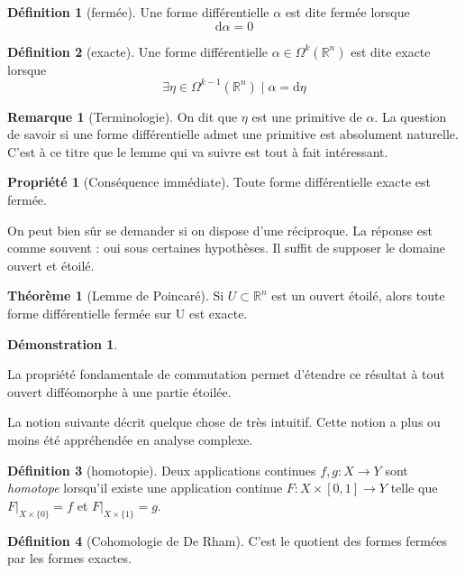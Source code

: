 \documentclass{article}
\newcommand{\R}{\mathbb{R}} %
\theoremstyle{definition} %
\newtheorem{defi}{Définition}
\newtheorem{rmq}{Remarque}
\newtheorem{thm}{Théorème}
\newtheorem{dem}{Démonstration}
\newtheorem{propri}{Propriété}
\newcommand{\OM}[1]{\Omega^{#1} (\R^n)}
\newcommand{\dd}{ \mathrm{d}}
\newcommand{\1}{\mathbb{1}} %
\begin{document}
\begin{defi}[fermée]
Une forme différentielle $\alpha$ est dite fermée lorsque 
$$\dd \alpha = 0$$
\end{defi}

\begin{defi}[exacte]
Une forme différentielle $\alpha \in \OM{k}$ est dite exacte lorsque 
$$\exists \eta \in \OM{k-1} \mid \alpha = \dd \eta$$
\end{defi}
\begin{rmq}[Terminologie]
On dit que $\eta $ est une primitive de $\alpha$. La question de savoir si une forme différentielle admet une primitive est absolument naturelle. C'est à ce titre que le lemme qui va suivre est tout à fait intéressant.
\end{rmq}

\begin{propri}[Conséquence immédiate]
Toute forme différentielle exacte est fermée.
\end{propri}

On peut bien sûr se demander si on dispose d'une réciproque. La réponse est comme souvent : oui sous certaines hypothèses. Il suffit de supposer le domaine ouvert et étoilé.

\begin{thm}[Lemme de Poincaré]
Si $U \subset \R^n$ est un ouvert étoilé, alors toute forme différentielle fermée sur U est exacte.
\end{thm}

\begin{dem}

\end{dem}

La propriété fondamentale de commutation permet d'étendre ce résultat à tout ouvert difféomorphe à une partie étoilée.




La notion suivante décrit quelque chose de très intuitif. Cette notion a plus ou moins été appréhendée en analyse complexe.
\begin{defi}[homotopie]
Deux applications continues $f,g: X\to Y$ sont \textit{homotope} lorsqu'il existe une application continue $F:X\times [0,1]\to Y$ telle que $F|_{X \times \{0\}}=f$ et $F|_{X\times \{1\}}=g$.
\end{defi}

\begin{defi}[Cohomologie de De Rham]
C'est le quotient des formes fermées par les formes exactes.
\end{defi}
\end{document}

